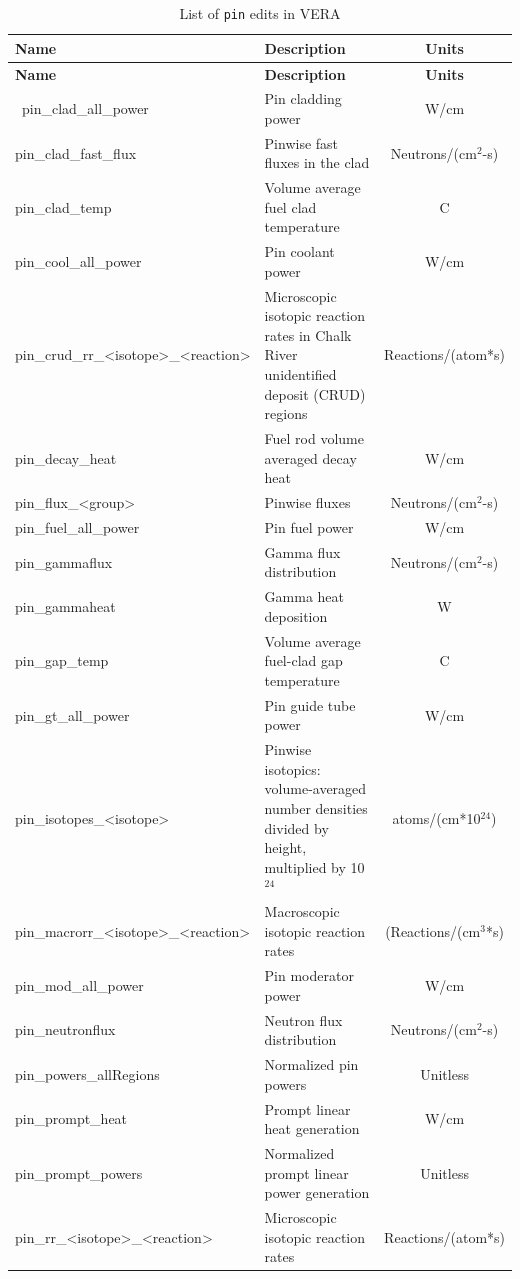 \begin{longtable}[h]{|l|p{}|c|}
    \caption{List of \texttt{pin} edits in VERA}
    \label{tab:pin-edits}
    \\

    \hline
    {\bf Name} & {\bf Description} & {\bf Units} \\
    \hline
    \endfirsthead
    \hline
    {\bf Name} & {\bf Description} & {\bf Units} \\
    \hline
    \endhead
    \hline
    \endfoot
    \hline
    \endlastfoot
    \hline
    \
pin\_clad\_all\_power & Pin cladding power & W/cm \\\hline
pin\_clad\_fast\_flux & Pinwise fast fluxes in the clad & Neutrons/(cm$^2$-s) \\\hline
pin\_clad\_temp & Volume average fuel clad temperature & C \\\hline
pin\_cool\_all\_power & Pin coolant power & W/cm \\\hline
pin\_crud\_rr\_<isotope>\_<reaction> & Microscopic isotopic reaction rates in Chalk River unidentified deposit (CRUD) regions & Reactions/(atom*s) \\\hline
pin\_decay\_heat & Fuel rod volume averaged decay heat & W/cm \\\hline
pin\_flux\_<group> & Pinwise fluxes & Neutrons/(cm$^2$-s) \\\hline
pin\_fuel\_all\_power & Pin fuel power & W/cm \\\hline
pin\_gammaflux & Gamma flux distribution & Neutrons/(cm$^2$-s) \\\hline
pin\_gammaheat & Gamma heat deposition & W \\\hline
pin\_gap\_temp & Volume average fuel-clad gap temperature & C \\\hline
pin\_gt\_all\_power & Pin guide tube power & W/cm \\\hline
pin\_isotopes\_<isotope> & Pinwise isotopics: volume-averaged number densities divided by height, multiplied by 10$^{24}$ & atoms/(cm*10$^{24}$) \\\hline
pin\_macrorr\_<isotope>\_<reaction> & Macroscopic isotopic reaction rates & (Reactions/(cm$^3$*s) \\\hline
pin\_mod\_all\_power & Pin moderator power & W/cm \\\hline
pin\_neutronflux & Neutron flux distribution & Neutrons/(cm$^2$-s) \\\hline
pin\_powers\_allRegions & Normalized pin powers & Unitless \\\hline
pin\_prompt\_heat & Prompt linear heat generation & W/cm \\\hline
pin\_prompt\_powers & Normalized prompt linear power generation & Unitless \\\hline
pin\_rr\_<isotope>\_<reaction> & Microscopic isotopic reaction rates & Reactions/(atom*s) \\\hline
\end{longtable}

